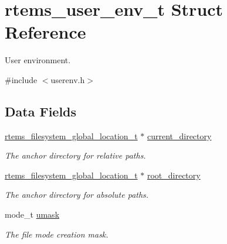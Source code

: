 \hypertarget{structrtems__user__env__t}{}\section{rtems\+\_\+user\+\_\+env\+\_\+t Struct Reference}
\label{structrtems__user__env__t}


User environment.  




{\ttfamily \#include $<$userenv.\+h$>$}

\subsection*{Data Fields}
\begin{DoxyCompactItemize}
\item 
\mbox{\label{structrtems__user__env__t_a1096afb2f19bf8483963625e25a74a5a}} 
\mbox{\hyperlink{structrtems__filesystem__global__location__t}{rtems\+\_\+filesystem\+\_\+global\+\_\+location\+\_\+t}} $\ast$ \mbox{\hyperlink{structrtems__user__env__t_a1096afb2f19bf8483963625e25a74a5a}{current\+\_\+directory}}
\begin{DoxyCompactList}\small\item\em The anchor directory for relative paths. \end{DoxyCompactList}\item 
\mbox{\label{structrtems__user__env__t_a5c0a86d4bf763e1aade75d26beb22220}} 
\mbox{\hyperlink{structrtems__filesystem__global__location__t}{rtems\+\_\+filesystem\+\_\+global\+\_\+location\+\_\+t}} $\ast$ \mbox{\hyperlink{structrtems__user__env__t_a5c0a86d4bf763e1aade75d26beb22220}{root\+\_\+directory}}
\begin{DoxyCompactList}\small\item\em The anchor directory for absolute paths. \end{DoxyCompactList}\item 
\mbox{\label{structrtems__user__env__t_a250fdb9d264f0544d0e53de36bd380fd}} 
mode\+\_\+t \mbox{\hyperlink{structrtems__user__env__t_a250fdb9d264f0544d0e53de36bd380fd}{umask}}
\begin{DoxyCompactList}\small\item\em The file mode creation mask. \end{DoxyCompactList}\item 

\end{DoxyCompactItemize}
